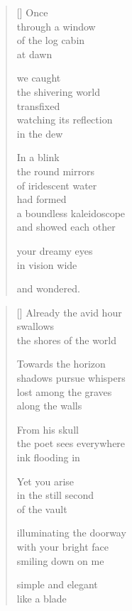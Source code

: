 \documentclass[14pt]{extbook}
\newcommand*{\centeredornament}{\centerline{\pgfornament[width=6cm]{88}}}
\begin{document}
\newpage

\vspace*{-15mm}
\centeredornament
\vspace*{-7mm}


\settowidth{\versewidth}{a boundless kaleidoscope}

\begin{verse}[\versewidth]
  Once \\
  through a window \\
  of the log cabin \\
  at dawn

  we caught \\
  the shivering world \\
  transfixed \\
  watching its reflection \\
  in the dew

  In a blink \\
  the round mirrors \\
  of iridescent water \\
  had formed \\
  a boundless kaleidoscope \\
  and showed each other

  your dreamy eyes \\
  in vision wide

  and wondered.
\end{verse}


\newpage

\vspace*{-15mm}
\centeredornament
\vspace*{-7mm}


\settowidth{\versewidth}{shadows pursue whispers}

\begin{verse}[\versewidth]
  Already the avid hour \\
  swallows \\
  the shores of the world

  Towards the horizon \\
  shadows pursue whispers \\
  lost among the graves \\
  along the walls

  From his skull \\
  the poet sees everywhere \\
  ink flooding in

  Yet you arise \\
  in the still second \\
  of the vault

  illuminating the doorway \\
  with your bright face \\
  smiling down on me

  simple and elegant \\
  like a blade
\end{verse}
\end{document}
